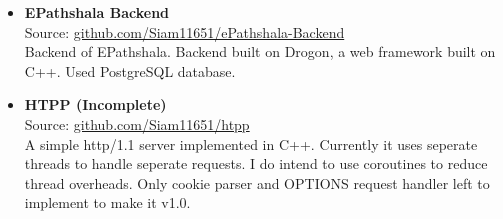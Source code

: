 \begin{itemize}
{    Frontend of EPathshala. It is an academic database project. Frontend built raw HTML, CSS and Javascript.
  }
  \item {
    \textbf{EPathshala Backend} \\
    Source: \href{https://github.com/Siam11651/ePathshala-Backend}{github.com/Siam11651/ePathshala-Backend} \\
    Backend of EPathshala. Backend built on Drogon, a web framework built on C++. Used PostgreSQL database.
  }
  \item {
    \textbf{HTPP (Incomplete)} \\
    Source: \href{https://github.com/Siam11651/htpp}{github.com/Siam11651/htpp} \\
    A simple http/1.1 server implemented in C++. Currently it uses seperate threads to handle seperate requests. I do intend to use coroutines to reduce thread overheads. Only cookie parser and OPTIONS request handler left to implement to make it v1.0.
  }
\end{itemize}
